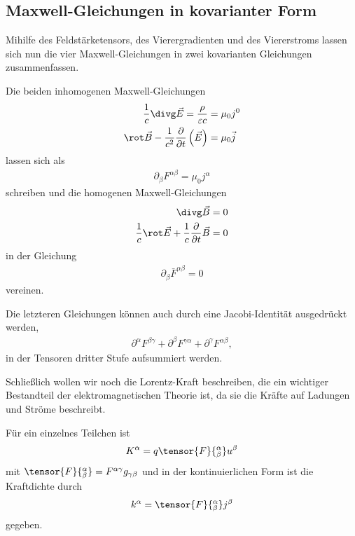 \subsection{Maxwell-Gleichungen in kovarianter Form}

Mihilfe des Feldstärketensors, des Vierergradienten und des Viererstroms lassen sich nun die vier Maxwell-Gleichungen in zwei kovarianten Gleichungen zusammenfassen. 

Die beiden inhomogenen Maxwell-Gleichungen
\begin{align*}
    \frac{1}{c}\divg \vec E = \frac{\rho}{\varepsilon c}&=\mu_0 j^0 \\ 
    \rot \vec B - \frac{1}{c^2}\frac{\partial}{\partial t}\left(\vec E\right) &= \mu_0 \vec j
\end{align*}
lassen sich als 
\begin{align}
    \boxed{\partial_\beta F^{\alpha\beta}=\mu_0 j^\alpha}
\end{align}
schreiben und die homogenen Maxwell-Gleichungen 
\begin{align*}
    \divg \vec B&=0 \\
    \frac{1}{c}\rot\vec E + \frac{1}{c} \frac{\partial}{\partial t}\vec B &=0
\end{align*}
in der Gleichung 
\begin{align}
    \boxed{\partial_\beta\bar F^{\alpha\beta} = 0}
\end{align}
vereinen. 

Die letzteren Gleichungen können auch durch eine Jacobi-Identität ausgedrückt werden,
\begin{align*}
    \partial^\alpha F^{\beta\gamma} + \partial^\beta F^{\gamma\alpha} + \partial^\gamma F^{\alpha\beta},
\end{align*}
in der Tensoren dritter Stufe aufsummiert werden. 

Schließlich wollen wir noch die Lorentz-Kraft beschreiben, die ein wichtiger Bestandteil der elektromagnetischen Theorie ist, da sie die Kräfte auf Ladungen und Ströme beschreibt. 

Für ein einzelnes Teilchen ist 
\begin{align*}
    K^\alpha =q \tensor{F}{^\alpha_\beta} u^\beta
\end{align*}
mit $\tensor{F}{^\alpha_\beta} = F^{\alpha\gamma} g_{\gamma\beta}$ und in der kontinuierlichen Form ist die Kraftdichte durch
\begin{align*}
    k^\alpha = \tensor{F}{^\alpha_\beta} j^\beta
\end{align*}
gegeben. 